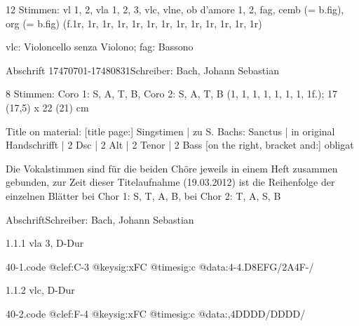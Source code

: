 \documentclass[a4paper, twocolumn, 11pt]{book}
\begin{document}
\par \textcolor{darkblue}{}  12 Stimmen: vl 1, 2, vla 1, 2, 3, vlc, vlne, ob d'amore 1, 2, fag, cemb (= b.fig), org (= b.fig)  (f.1r, 1r, 1r, 1r, 1r, 1r, 1r, 1r, 1r, 1r, 1r, 1r, 1r)\newline \begin{small} vlc: {\textquotedbl}Violoncello senza Violono{\textquotedbl}; fag: {\textquotedbl}Bassono{\textquotedbl}\end{small} \newline Abschrift  17470701-17480831\newline Schreiber: Bach, Johann Sebastian
\par \textcolor{darkblue}{}  8 Stimmen: Coro 1: S, A, T, B, Coro 2: S, A, T, B  (1, 1, 1, 1, 1, 1, 1, 1f.); 17 (17,5) x 22 (21) cm\newline \begin{small} Title on material: [title page:] Singstimen | zu S. Bachs: Sanctus | in original Handschrifft | 2 Dsc | 2 Alt | 2 Tenor | 2 Bass [on the right, bracket and:] obligat\end{small} \newline \begin{small} Die Vokalstimmen sind für die beiden Chöre jeweils in einem Heft zusammen gebunden, zur Zeit dieser Titelaufnahme (19.03.2012) ist die Reihenfolge der einzelnen Blätter bei Chor 1: S, T, A, B, bei Chor 2: T, A, S, B\end{small} \newline Abschrift\newline Schreiber: Bach, Johann Sebastian
\par 1.1.1  vla 3, D-Dur  
\begin{filecontents*}{40-1.code}
@clef:C-3
@keysig:xFC
@timesig:c
@data:4-4.D{8EFG}/2A4F-/
\end{filecontents*}
\newline %
\par 1.1.2  vlc, D-Dur  
\begin{filecontents*}{40-2.code}
@clef:F-4
@keysig:xFC
@timesig:c
@data:,4DDDD/DDDD/
\end{filecontents*}
\newline %
\end{document}
